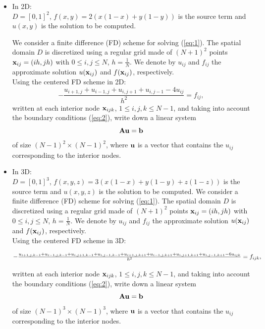 \begin{itemize}

\item In 2D:\\
$D=[0,1]^2$,   $f(x,y)=2(x(1-x)+y(1-y))$ is the source term and $u(x,y)$ is the solution to be computed.\par
We consider a finite difference (FD) scheme for solving (\ref{eq:1}). The spatial domain $D$ is discretized using a regular grid made of $(N+1)^2$ points $\mathbf{x}_{ij}=(ih,jh)$ with $0\leq i,j \leq N$, $h=\frac{1}{N}$. We denote by $u_{ij}$ and $f_{ij}$ the approximate solution $u(\mathbf{x}_{ij})$ and $f(\mathbf{x}_{ij})$, respectively.\\
Using the centered FD scheme in 2D:
$$
-\frac{u_{i+1,j}+u_{i-1,j}+u_{i,j+1}+u_{i,j-1}-4 u_{ij}}{h^2}=f_{ij},
$$
written at each interior node $\mathbf{x}_{ijk}$, $1 \leq i,j,k \leq N-1$, and taking into account the boundary conditions (\ref{eq:2}), write down a linear system \begin{equation}\label{eq:linsyst1} \mathbf{A} \mathbf{u} = \mathbf{b}
\end{equation} of size $(N-1)^2\times (N-1)^2$, where $\mathbf{u}$ is a vector that contains the $u_{ij}$ corresponding to the interior nodes.

\item In 3D: \\
$D=[0,1]^3$, $f(x,y,z)=3(x(1-x)+y(1-y)+z(1-z))$ is the source term and $u(x,y,z)$ is the solution to be computed. We consider a finite difference (FD) scheme for solving (\ref{eq:1}). The spatial domain $D$ is discretized using a regular grid made of $(N+1)^2$ points $\mathbf{x}_{ij}=(ih,jh)$ with $0\leq i,j \leq N$, $h=\frac{1}{N}$. We denote by $u_{ij}$ and $f_{ij}$ the approximate solution $u(\mathbf{x}_{ij})$ and $f(\mathbf{x}_{ij})$, respectively. \\
Using the centered FD scheme in 3D:

$$
\Scale[1]{-\frac{u_{i+1,j,k-1}+u_{i-1,j,k-1}+u_{i,j+1,k-1}+u_{i,j-1,k-1} + u_{i+1,j,k+1}+u_{i-1,j,k+1}+u_{i,j+1,k+1}+u_{i,j-1,k+1}-6 u_{ijk}}{h^2}=f_{ijk},}
$$

written at each interior node $\mathbf{x}_{ijk}$, $1 \leq i,j,k \leq N-1$, and taking into account the boundary conditions (\ref{eq:2}), write down a linear system \begin{equation}\label{eq:linsyst2} \mathbf{A} \mathbf{u} = \mathbf{b}
\end{equation} of size $(N-1)^3\times (N-1)^3$, where $\mathbf{u}$ is a vector that contains the $u_{ij}$ corresponding to the interior nodes.

\end{itemize}

